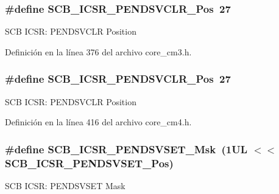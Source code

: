 \subsubsection[{\texorpdfstring{S\+C\+B\+\_\+\+I\+C\+S\+R\+\_\+\+P\+E\+N\+D\+S\+V\+C\+L\+R\+\_\+\+Pos}{SCB_ICSR_PENDSVCLR_Pos}}]{\setlength{\rightskip}{0pt plus 5cm}\#define S\+C\+B\+\_\+\+I\+C\+S\+R\+\_\+\+P\+E\+N\+D\+S\+V\+C\+L\+R\+\_\+\+Pos~27}\hypertarget{group___c_m_s_i_s___s_c_b_gae218d9022288f89faf57187c4d542ecd}{}\label{group___c_m_s_i_s___s_c_b_gae218d9022288f89faf57187c4d542ecd}
S\+CB I\+C\+SR\+: P\+E\+N\+D\+S\+V\+C\+LR Position 

Definición en la línea 376 del archivo core\+\_\+cm3.\+h.

\subsubsection[{\texorpdfstring{S\+C\+B\+\_\+\+I\+C\+S\+R\+\_\+\+P\+E\+N\+D\+S\+V\+C\+L\+R\+\_\+\+Pos}{SCB_ICSR_PENDSVCLR_Pos}}]{\setlength{\rightskip}{0pt plus 5cm}\#define S\+C\+B\+\_\+\+I\+C\+S\+R\+\_\+\+P\+E\+N\+D\+S\+V\+C\+L\+R\+\_\+\+Pos~27}\hypertarget{group___c_m_s_i_s___s_c_b_gae218d9022288f89faf57187c4d542ecd}{}\label{group___c_m_s_i_s___s_c_b_gae218d9022288f89faf57187c4d542ecd}
S\+CB I\+C\+SR\+: P\+E\+N\+D\+S\+V\+C\+LR Position 

Definición en la línea 416 del archivo core\+\_\+cm4.\+h.

\subsubsection[{\texorpdfstring{S\+C\+B\+\_\+\+I\+C\+S\+R\+\_\+\+P\+E\+N\+D\+S\+V\+S\+E\+T\+\_\+\+Msk}{SCB_ICSR_PENDSVSET_Msk}}]{\setlength{\rightskip}{0pt plus 5cm}\#define S\+C\+B\+\_\+\+I\+C\+S\+R\+\_\+\+P\+E\+N\+D\+S\+V\+S\+E\+T\+\_\+\+Msk~(1\+U\+L $<$$<$ S\+C\+B\+\_\+\+I\+C\+S\+R\+\_\+\+P\+E\+N\+D\+S\+V\+S\+E\+T\+\_\+\+Pos)}\hypertarget{group___c_m_s_i_s___s_c_b_ga1e40d93efb402763c8c00ddcc56724ff}{}\label{group___c_m_s_i_s___s_c_b_ga1e40d93efb402763c8c00ddcc56724ff}
S\+CB I\+C\+SR\+: P\+E\+N\+D\+S\+V\+S\+ET Mask 

